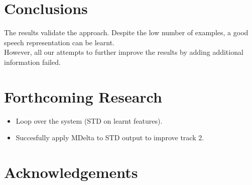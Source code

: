 \documentclass[final]{beamer}
\begin{document}
\begin{frame}[t]
\begin{multicols}{3}


\section{Conclusions}

The results validate the approach. Despite the low number of examples, a good speech representation can be learnt.\\
However, all our attempts to further improve the results by adding additional information failed.



\section{Forthcoming Research}

\begin{itemize}
\item Loop over the system (STD on learnt features).
\item Succesfully apply MDelta to STD output to improve track 2.
\end{itemize}


\nocite{*} %


\section{Acknowledgements}


\end{multicols}
\end{frame}
\end{document}
